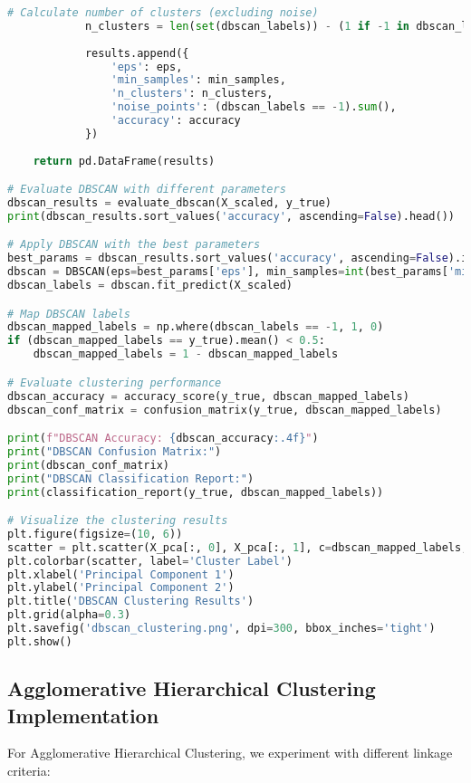 \begin{lstlisting}[language=Python, caption=DBSCAN Implementation and Parameter Tuning]
            # Calculate number of clusters (excluding noise)
            n_clusters = len(set(dbscan_labels)) - (1 if -1 in dbscan_labels else 0)
            
            results.append({
                'eps': eps,
                'min_samples': min_samples,
                'n_clusters': n_clusters,
                'noise_points': (dbscan_labels == -1).sum(),
                'accuracy': accuracy
            })
    
    return pd.DataFrame(results)

# Evaluate DBSCAN with different parameters
dbscan_results = evaluate_dbscan(X_scaled, y_true)
print(dbscan_results.sort_values('accuracy', ascending=False).head())

# Apply DBSCAN with the best parameters
best_params = dbscan_results.sort_values('accuracy', ascending=False).iloc[0]
dbscan = DBSCAN(eps=best_params['eps'], min_samples=int(best_params['min_samples']))
dbscan_labels = dbscan.fit_predict(X_scaled)

# Map DBSCAN labels
dbscan_mapped_labels = np.where(dbscan_labels == -1, 1, 0)
if (dbscan_mapped_labels == y_true).mean() < 0.5:
    dbscan_mapped_labels = 1 - dbscan_mapped_labels

# Evaluate clustering performance
dbscan_accuracy = accuracy_score(y_true, dbscan_mapped_labels)
dbscan_conf_matrix = confusion_matrix(y_true, dbscan_mapped_labels)

print(f"DBSCAN Accuracy: {dbscan_accuracy:.4f}")
print("DBSCAN Confusion Matrix:")
print(dbscan_conf_matrix)
print("DBSCAN Classification Report:")
print(classification_report(y_true, dbscan_mapped_labels))

# Visualize the clustering results
plt.figure(figsize=(10, 6))
scatter = plt.scatter(X_pca[:, 0], X_pca[:, 1], c=dbscan_mapped_labels, alpha=0.6, cmap='viridis')
plt.colorbar(scatter, label='Cluster Label')
plt.xlabel('Principal Component 1')
plt.ylabel('Principal Component 2')
plt.title('DBSCAN Clustering Results')
plt.grid(alpha=0.3)
plt.savefig('dbscan_clustering.png', dpi=300, bbox_inches='tight')
plt.show()
\end{lstlisting}

\subsection{Agglomerative Hierarchical Clustering Implementation}
For Agglomerative Hierarchical Clustering, we experiment with different linkage criteria:

